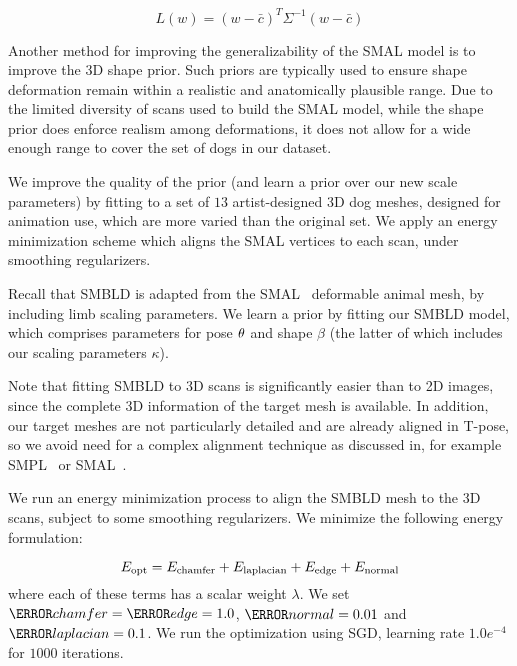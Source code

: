 \begin{equation}
    L(w) = (w - \bar{c})^T\Sigma^{-1}(w-\bar{c})
\end{equation}



Another method for improving the generalizability of the SMAL model is to improve the 3D shape prior. Such priors are typically used to ensure shape deformation remain within a realistic and anatomically plausible range. Due to the limited diversity of scans used to build the SMAL model, while the shape prior does enforce realism among deformations, it does not allow for a wide enough range to cover the set of dogs in our dataset.

We improve the quality of the prior (and learn a prior over our new scale parameters) by fitting to a set of $13$ artist-designed 3D dog meshes, designed for animation use, which are more varied than the original set. We apply an energy minimization scheme which aligns the SMAL vertices to each scan, under smoothing regularizers.

Recall that SMBLD is adapted from the SMAL~\cite{zuffi2017menagerie} deformable animal mesh, by including limb scaling parameters. We learn a prior by fitting our SMBLD model, which comprises parameters for pose $\theta$ and shape $\beta$ (the latter of which includes our scaling parameters $\kappa$).

Note that fitting SMBLD to 3D scans is significantly easier than to 2D images, since the complete 3D information of the target mesh is available. In addition, our target meshes are not particularly detailed and are already aligned in T-pose, so we avoid need for a complex alignment technique as discussed in, for example SMPL~\cite{loper15smpl} or SMAL~\cite{zuffi2017menagerie}.

We run an energy minimization process to align the SMBLD mesh to the 3D scans, subject to some smoothing regularizers. We minimize the following energy formulation:

\begin{equation}
    E_\textrm{opt} = E_\textrm{chamfer} + E_\textrm{laplacian} + E_\textrm{edge} + E_\textrm{normal}
\end{equation}
where each of these terms has a scalar weight $\lambda$. We set $\W{chamfer}=\W{edge}=1.0$, $\W{normal}=0.01$ and $\W{laplacian}=0.1$. We run the optimization using SGD, learning rate $1.0e^{-4}$ for $1000$ iterations.


